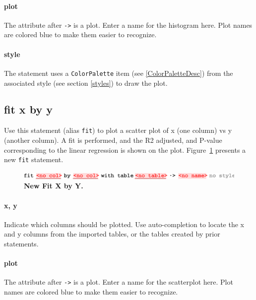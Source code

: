 \paragraph{plot}
The attribute after \texttt{->} is a plot. Enter a name for the histogram here. Plot names are colored blue to make them easier to recognize.

\paragraph{style}
The statement uses a \texttt{Color\allowbreak{}Palette} item (see \ref{ColorPaletteDesc}) from the associated style (see section \ref{styles}) to draw the plot. 

\subsection{fit x by y}
Use this statement (alias \texttt{fit}) to plot a scatter plot of x (one column) vs y (another column). A fit is performed, and the R2 adjusted, and P-value corresponding to the linear regression is shown on the plot. Figure~\ref{fig:NewFitXByY} presents a new \texttt{fit} statement.

\begin{figure}[h!tbp]
  \centering
  \includegraphics[width=\figWidthWide]{figures/NewFitXByY.pdf}
\caption[New Fit X by Y.]{\textbf{New Fit X by Y.}}
\label{fig:NewFitXByY}
\end{figure}

\paragraph{x, y}
Indicate which columns should be plotted. Use auto-completion to locate the x and y columns from the imported tables, or the tables created by prior statements. 

\paragraph{plot}
The attribute after \texttt{->} is a plot. Enter a name for the scatterplot here. Plot names are colored blue to make them easier to recognize.

